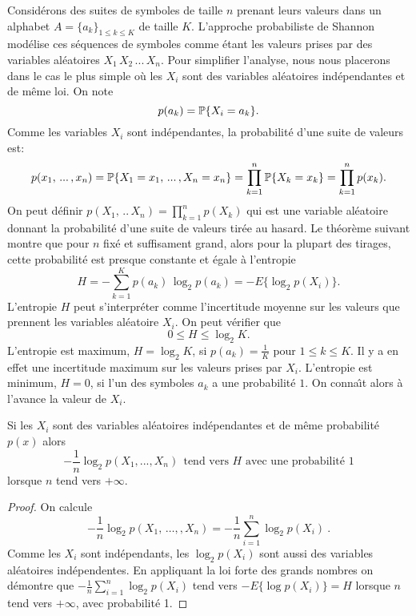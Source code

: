 Consid\'erons des suites de symboles de taille $n$ prenant leurs
valeurs dans un alphabet $A = \{a_k \}_{1 \leq k \leq K}$
de taille $K$.
L'approche probabiliste de Shannon mod\'elise
ces s\'equences de symboles comme \'etant les valeurs prises
par des variables al\'eatoires $X_1\, X_2\,...\, X_n$.
Pour simplifier l'analyse, nous nous placerons dans le cas le
plus simple o\`u les $X_i$ sont des variables al\'eatoires
ind\'ependantes et de m\^eme loi. On note
\[
p(a_k) = \mathbb{P} \{ X_i = a_k \} .
\]
Comme les variables $X_i$ sont ind\'ependantes, la
probabilit\'e d'une suite de valeurs est:
\[
p(x_1,\, ...\,, x_n) = \mathbb{P} \{X_1 = x_1 ,\, ...\, , X_n = x_n \} =
\prod_{k=1}^n \mathbb{P} \{X_k = x_k \} = \prod_{k=1}^n p(x_k) .
\]
On peut d\'efinir $p(X_1 ,\, ..\, X_n) = \prod_{k=1}^n p(X_k)$
qui est une variable al\'eatoire donnant la probabilit\'e
d'une suite de valeurs tir\'ee au hasard.
Le th\'eor\`eme suivant montre que pour $n$ fix\'e
et suffisament grand, alors pour la plupart des
tirages, cette probabilit\'e est presque constante et
\'egale \`a l'entropie
\[
H = - \sum_{k=1}^K p(a_k)\, \log_2 p(a_k) = - E\{ \log_2 p(X_i)\} .
\]
L'entropie $H$ peut s'interpr\'eter comme
l'incertitude moyenne sur les valeurs
que prennent les variables al\'eatoire $X_i$.
On peut v\'erifier que
\[
0 \leq H \leq \log_2 K .
\]
L'entropie est maximum, $H = \log_2 K$, si
$p(a_k) = \frac 1 K$ pour $1 \leq k \leq K$.
Il y a en effet une incertitude maximum sur les valeurs prises
par $X_i$.
L'entropie est minimum, $H = 0$, si l'un des symboles $a_k$
a une probabilit\'e $1$.
On conna\^{\i}t alors \`a l'avance la valeur de $X_i$.

\begin{theorem}
\label{EquiTh}
Si les $X_i$ sont des variables al\'eatoires ind\'ependantes
et de m\^eme probabilit\'e $p(x)$ alors
\[
-\frac 1 n \log_2 p(X_1, ...,X_n)~~\mbox{tend vers $H$ avec
une probabilit\'e $1$}
\]
lorsque $n$ tend vers $+\infty$.
\end{theorem}
\begin{proof}
On calcule
\[
- \frac 1 n \log_2 p(X_1,\, \dots ,, X_n) = - \frac 1 n \sum_{i=1}^n
\log_2 p(X_i)~.
\]
Comme les $X_i$ sont ind\'ependants, les $\log_2 p(X_i)$ sont aussi
des variables al\'eatoires ind\'ependentes.
En appliquant la loi forte des grands nombres \cite{neveu}
on d\'emontre que
$- \frac 1 n \sum_{i=1}^n \log_2 p(X_i)$ tend
vers $- E\{ \log p(X_i)\} = H$ lorsque $n$ tend vers $+\infty$,
avec probabilit\'e 1. 
\end{proof}

